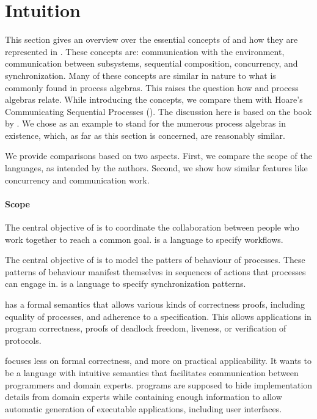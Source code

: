 
\section{Intuition}

This section gives an overview over the essential concepts of \TOP and how they are represented in \TOPHAT.
These concepts are: communication with the environment, communication between subsystems, sequential composition, concurrency, and synchronization.
Many of these concepts are similar in nature to what is commonly found in process algebras.
This raises the question how \TOP and process algebras relate.
While introducing the concepts, we compare them with Hoare's Communicating Sequential Processes (\CSP).
The discussion here is based on the book by \citet{books/Hoare85CSP}.
We chose \CSP as an example to stand for the numerous process algebras in existence, which, as far as this section is concerned, are reasonably similar.

We provide comparisons based on two aspects.
First, we compare the scope of the languages, as intended by the authors.
Second, we show how similar features like concurrency and communication work.


\paragraph{Scope}

The central objective of \TOP is to coordinate the collaboration between people who work together to reach a common goal.
\TOP is a language to specify workflows.

The central objective of \CSP is to model the patters of behaviour of processes.
These patterns of behaviour manifest themselves in sequences of actions that processes can engage in.
\CSP is a language to specify synchronization patterns.

\CSP has a formal semantics that allows various kinds of correctness proofs, including equality of processes, and adherence to a specification.
This allows applications in program correctness, proofs of deadlock freedom, liveness, or verification of protocols.

\TOP focuses less on formal correctness, and more on practical applicability.
It wants to be a language with intuitive semantics that facilitates communication between programmers and domain experts.
\TOP programs are supposed to hide implementation details from domain experts while containing enough information to allow automatic generation of executable applications, including user interfaces.

